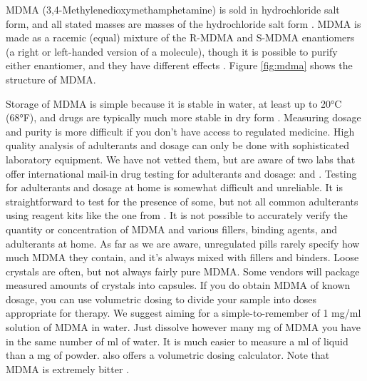 \documentclass[12pt,letterpaper]{book}
\begin{document}
MDMA (3,4-Methylenedioxymethamphetamine) is sold in hydrochloride salt form, and all stated masses are masses of the hydrochloride salt form \cite{liechtiInteractions}. MDMA is made as a racemic (equal) mixture of the R-MDMA and S-MDMA enantiomers (a right or left-handed version of a molecule), though it is possible to purify either enantiomer, and they have different effects \cite{straumann2024racemic}. Figure \ref{fig:mdma} shows the structure of MDMA.

Storage of MDMA is simple because it is stable in water, at least up to 20°C (68°F), and drugs are typically much more stable in dry form \cite{clauwaertStability}. Measuring dosage and purity is more difficult if you don't have access to regulated medicine. High quality analysis of adulterants and dosage can only be done with sophisticated laboratory equipment. We have not vetted them, but are aware of two labs that offer international mail-in drug testing for adulterants and dosage: \textcite{kykeonTesting} and \textcite{energyTesting}. Testing for adulterants and dosage at home is somewhat difficult and unreliable. It is straightforward to test for the presence of some, but not all common adulterants using reagent kits like the one from \textcite{danceSafeTestingKit} \cite{reagentInstructions}. It is not possible to accurately verify the quantity or concentration of MDMA and various fillers, binding agents, and adulterants at home. As far as we are aware, unregulated pills rarely specify how much MDMA they contain, and it's always mixed with fillers and binders. Loose crystals are often, but not always fairly pure MDMA. Some vendors will package measured amounts of crystals into capsules. If you do obtain MDMA of known dosage, you can use volumetric dosing to divide your sample into doses appropriate for therapy. We suggest aiming for a simple-to-remember of 1 mg/ml solution of MDMA in water. Just dissolve however many mg of MDMA you have in the same number of ml of water. It is much easier to measure a ml of liquid than a mg of powder. \textcite{volumetricDilution} also offers a volumetric dosing calculator. Note that MDMA is extremely bitter \cite{milivcevic2020bitter}.
\end{document}

